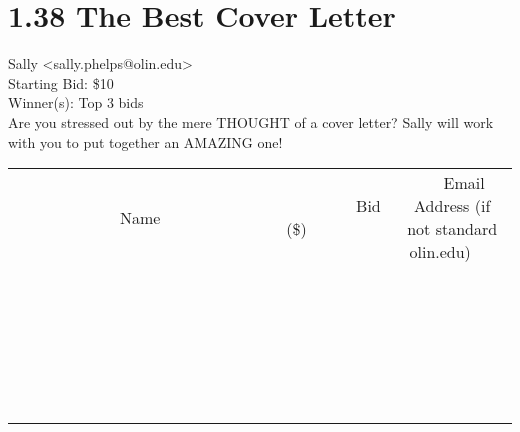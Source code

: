 \documentclass[11pt]{article}
\begin{document}
					\section*{1.38 The Best Cover Letter}
					Sally <sally.phelps@olin.edu> \\
					Starting Bid: \$10 \\
					Winner(s): Top 3 bids \\
					Are you stressed out by the mere THOUGHT of a cover letter?  Sally will work with you to put together an AMAZING one! \\
					[6ex]
					\begin{tabular}{c c c}
						~~~~~~~~~~~~~Name~~~~~~~~~~~~~ & ~~~~~~~~~Bid (\$)~~~~~~~~~ & ~~~Email Address (if not standard olin.edu)~~~ \\
				
 & & \\
\hline
 & & \\
\hline
 & & \\
\hline
 & & \\
\hline
 & & \\
\hline
 & & \\
\hline
 & & \\
\hline
 & & \\
\hline
 & & \\
\hline
 & & \\
\hline
 & & \\
\hline
 & & \\
\hline
 & & \\
\hline
 & & \\
\hline
 & & \\
\hline
 & & \\
\hline
 & & \\
\hline
 & & \\
\hline
 & & \\
\hline
 & & \\
\hline
 & & \\
\hline
 & & \\
\hline
 & & \\
\hline
 & & \\
\hline
 & & \\
\hline
 & & \\
\hline
					\end{tabular}
					\clearpage
				
\end{document}
